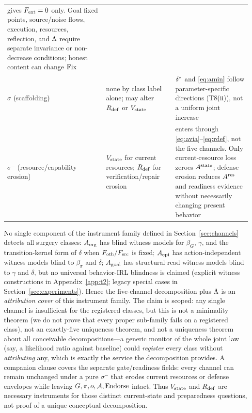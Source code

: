 \begin{theorem}
\begin{longtable}{@{}>{\raggedright\arraybackslash}p{}
>{\raggedright\arraybackslash}p{}
>{\raggedright\arraybackslash}p{}@{}}
gives $F_{\mathrm{ext}}=0$ only. Goal fixed points, source/noise flows, execution,
resources, reflection, and $\Lambda$ require separate invariance or non-decrease
conditions; honest content can change $\mathrm{Fix}$ \\
$\sigma$ (scaffolding) & none by class label alone; may alter $R_{\mathrm{def}}$ or $V_{\mathrm{state}}$ &
$\delta^{*}$ and \eqref{eq:amin} follow parameter-specific directions
(T8(ii)), not a uniform joint increase \\
$\sigma^{-}$ (resource/capability erosion) & $V_{\mathrm{state}}$ for current resources;
$R_{\mathrm{def}}$ for verification/repair erosion & enters through
\eqref{eq:avia}--\eqref{eq:rdef}, not the five channels. Only current-resource
loss zeroes $A^{\mathrm{state}}$; defense erosion reduces $A^{\mathrm{res}}$ and readiness evidence
without necessarily changing present behavior \\
\end{longtable}
\endgroup
\end{theorem}

\begin{proposition}\label{thm:necessity}
No single component of the instrument family defined in
Section~\ref{sec:channels} detects all surgery classes: $A_{\mathrm{org}}$ has blind
witness models for $\beta_G$, $\gamma$, and the transition-kernel form of
$\delta$ when $F_{\mathrm{oth}}/F_{\mathrm{src}}$ is fixed; $A_{\mathrm{epi}}$ has action-independent witness
models blind to $\beta_\pi$ and $\delta$;
$A_{\mathrm{goal}}$ has structural-read witness models blind to $\gamma$ and $\delta$,
but no universal behavior-IRL blindness is claimed (explicit witness
constructions in Appendix~\ref{app:t2}; legacy special cases in
Section~\ref{sec:experiments}). Hence
the five-channel decomposition plus $\Lambda$ is an \emph{attribution cover} of
this instrument family. The claim is scoped: any single channel is
insufficient for the registered classes, but this is not a minimality theorem
(we do not prove that every proper sub-family fails on a registered class),
not an exactly-five uniqueness theorem, and not a uniqueness theorem about
all conceivable decompositions---a generic monitor of the whole joint law
(say, a likelihood ratio against baseline) could \emph{register} every class
without \emph{attributing} any, which is exactly the service the
decomposition provides. A companion clause covers the separate gate/readiness
fields: every channel can remain unchanged under a pure $\sigma^{-}$ that
erodes current resources or defense envelopes while leaving
$G,\pi,o,\mathcal{A},\mathrm{Endorse}$ intact. Thus $V_{\mathrm{state}}$ and $R_{\mathrm{def}}$ are necessary
instruments for those distinct current-state and preparedness questions, not
proof of a unique conceptual decomposition.
\end{proposition}

